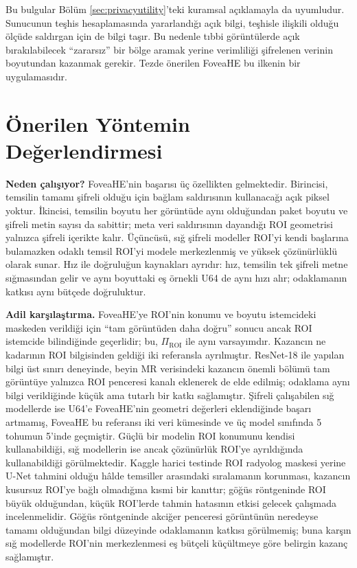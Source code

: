 Bu bulgular Bölüm \ref{sec:privacyutility}'teki kuramsal açıklamayla da uyumludur. Sunucunun teşhis hesaplamasında yararlandığı açık bilgi, teşhisle ilişkili olduğu ölçüde saldırgan için de bilgi taşır. Bu nedenle tıbbi görüntülerde açık bırakılabilecek ``zararsız'' bir bölge aramak yerine verimliliği şifrelenen verinin boyutundan kazanmak gerekir. Tezde önerilen FoveaHE bu ilkenin bir uygulamasıdır.

\section{Önerilen Yöntemin Değerlendirmesi}\label{sec:fovtartisma}

\textbf{Neden çalışıyor?} FoveaHE'nin başarısı üç özellikten gelmektedir. Birincisi, temsilin tamamı şifreli olduğu için bağlam saldırısının kullanacağı açık piksel yoktur. İkincisi, temsilin boyutu her görüntüde aynı olduğundan paket boyutu ve şifreli metin sayısı da sabittir; meta veri saldırısının dayandığı ROI geometrisi yalnızca şifreli içerikte kalır. Üçüncüsü, sığ şifreli modeller ROI'yi kendi başlarına bulamazken odaklı temsil ROI'yi modele merkezlenmiş ve yüksek çözünürlüklü olarak sunar. Hız ile doğruluğun kaynakları ayrıdır: hız, temsilin tek şifreli metne sığmasından gelir ve aynı boyuttaki eş örnekli U64 de aynı hızı alır; odaklamanın katkısı aynı bütçede doğruluktur.

\textbf{Adil karşılaştırma.} FoveaHE'ye ROI'nin konumu ve boyutu istemcideki maskeden verildiği için ``tam görüntüden daha doğru'' sonucu ancak ROI istemcide bilindiğinde geçerlidir; bu, $\Pi_{\mathrm{ROI}}$ ile aynı varsayımdır. Kazancın ne kadarının ROI bilgisinden geldiği iki referansla ayrılmıştır. ResNet-18 ile yapılan bilgi üst sınırı deneyinde, beyin MR verisindeki kazancın önemli bölümü tam görüntüye yalnızca ROI penceresi kanalı eklenerek de elde edilmiş; odaklama aynı bilgi verildiğinde küçük ama tutarlı bir katkı sağlamıştır. Şifreli çalışabilen sığ modellerde ise U64'e FoveaHE'nin geometri değerleri eklendiğinde başarı artmamış, FoveaHE bu referansı iki veri kümesinde ve üç model sınıfında 5 tohumun 5'inde geçmiştir. Güçlü bir modelin ROI konumunu kendisi kullanabildiği, sığ modellerin ise ancak çözünürlük ROI'ye ayrıldığında kullanabildiği görülmektedir. Kaggle harici testinde ROI radyolog maskesi yerine U-Net tahmini olduğu hâlde temsiller arasındaki sıralamanın korunması, kazancın kusursuz ROI'ye bağlı olmadığına kısmi bir kanıttır; göğüs röntgeninde ROI büyük olduğundan, küçük ROI'lerde tahmin hatasının etkisi gelecek çalışmada incelenmelidir. Göğüs röntgeninde akciğer penceresi görüntünün neredeyse tamamı olduğundan bilgi düzeyinde odaklamanın katkısı görülmemiş; buna karşın sığ modellerde ROI'nin merkezlenmesi eş bütçeli küçültmeye göre belirgin kazanç sağlamıştır.

